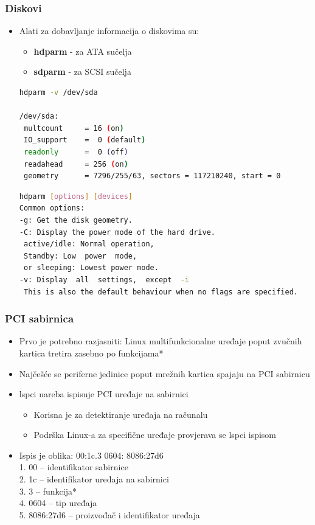 \documentclass[croatian,t]{beamer} %
\begin{document}
	\begin{frame}[fragile] %
	\frametitle{Diskovi}
		\begin{itemize}
		\item Alati za dobavljanje informacija o diskovima su:
			\begin{itemize}
				\item \textbf{hdparm} - za ATA sučelja
				\item \textbf{sdparm} - za SCSI sučelja
			\end{itemize}
		\begin{lstlisting}[basicstyle={\tiny\ttfamily},language=bash]
hdparm -v /dev/sda

/dev/sda:
 multcount     = 16 (on)
 IO_support    =  0 (default) 
 readonly      =  0 (off)
 readahead     = 256 (on)
 geometry      = 7296/255/63, sectors = 117210240, start = 0
		\end{lstlisting}
		\begin{lstlisting}[basicstyle={\tiny\ttfamily},language=bash]
hdparm [options] [devices]
Common options:
-g: Get the disk geometry.
-C: Display the power mode of the hard drive.
 active/idle: Normal operation,
 Standby: Low  power  mode,
 or sleeping: Lowest power mode.
-v: Display  all  settings,  except  -i
 This is also the default behaviour when no flags are specified.
 		\end{lstlisting}
		\end{itemize}
	\end{frame}
	
	\begin{frame}[fragile]
	\frametitle{PCI sabirnica}
		\begin{itemize}
			\item Prvo je potrebno razjasniti: Linux multifunkcionalne uređaje poput zvučnih kartica tretira zasebno po funkcijama*
			\item Najčešće se periferne jedinice poput mrežnih kartica spajaju na PCI sabirnicu
			\item lspci nareba ispisuje PCI uređaje na sabirnici
				\begin{itemize} 
					\item Korisna je za detektiranje uređaja na računalu
					\item Podrška Linux-a za specifične uređaje provjerava se lspci ispisom 
				\end{itemize}
			\item Ispis je oblika: 00:1c.3 0604: 8086:27d6 \\
1. 00 – identifikator sabirnice \\
2. 1c – identifikator uređaja na sabirnici \\
3. 3 – funkcija* \\
4. 0604 – tip uređaja \\ 
5. 8086:27d6 – proizvođač i identifikator uređaja \\
		\end{itemize}
	\end{frame}
	
\end{document}
